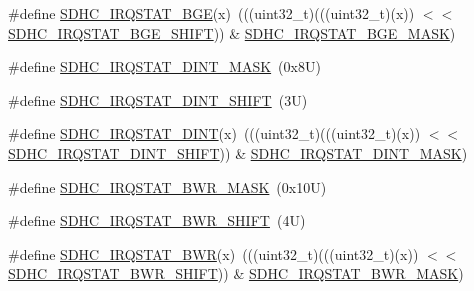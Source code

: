\begin{DoxyCompactItemize}
\item 
\#define \mbox{\hyperlink{group___s_d_h_c___register___masks_gaf7f550254ba83d0557f63801bd944d28}{S\+D\+H\+C\+\_\+\+I\+R\+Q\+S\+T\+A\+T\+\_\+\+B\+GE}}(x)~(((uint32\+\_\+t)(((uint32\+\_\+t)(x)) $<$$<$ \mbox{\hyperlink{group___s_d_h_c___register___masks_ga75e2ea9856a63d888c9416ad4c2778dc}{S\+D\+H\+C\+\_\+\+I\+R\+Q\+S\+T\+A\+T\+\_\+\+B\+G\+E\+\_\+\+S\+H\+I\+FT}})) \& \mbox{\hyperlink{group___s_d_h_c___register___masks_gabe62f8072b3ceb7a49288ba5976418d0}{S\+D\+H\+C\+\_\+\+I\+R\+Q\+S\+T\+A\+T\+\_\+\+B\+G\+E\+\_\+\+M\+A\+SK}})
\item 
\#define \mbox{\hyperlink{group___s_d_h_c___register___masks_gabed6097264bafe668b2aa727ed9f10c3}{S\+D\+H\+C\+\_\+\+I\+R\+Q\+S\+T\+A\+T\+\_\+\+D\+I\+N\+T\+\_\+\+M\+A\+SK}}~(0x8\+U)
\item 
\#define \mbox{\hyperlink{group___s_d_h_c___register___masks_ga9760308d931d6e654feeaf46f96572ae}{S\+D\+H\+C\+\_\+\+I\+R\+Q\+S\+T\+A\+T\+\_\+\+D\+I\+N\+T\+\_\+\+S\+H\+I\+FT}}~(3\+U)
\item 
\#define \mbox{\hyperlink{group___s_d_h_c___register___masks_gadf0823aae9132e5c37284167522f32f0}{S\+D\+H\+C\+\_\+\+I\+R\+Q\+S\+T\+A\+T\+\_\+\+D\+I\+NT}}(x)~(((uint32\+\_\+t)(((uint32\+\_\+t)(x)) $<$$<$ \mbox{\hyperlink{group___s_d_h_c___register___masks_ga9760308d931d6e654feeaf46f96572ae}{S\+D\+H\+C\+\_\+\+I\+R\+Q\+S\+T\+A\+T\+\_\+\+D\+I\+N\+T\+\_\+\+S\+H\+I\+FT}})) \& \mbox{\hyperlink{group___s_d_h_c___register___masks_gabed6097264bafe668b2aa727ed9f10c3}{S\+D\+H\+C\+\_\+\+I\+R\+Q\+S\+T\+A\+T\+\_\+\+D\+I\+N\+T\+\_\+\+M\+A\+SK}})
\item 
\#define \mbox{\hyperlink{group___s_d_h_c___register___masks_ga26691d1818925c3763302d3b227e6cd4}{S\+D\+H\+C\+\_\+\+I\+R\+Q\+S\+T\+A\+T\+\_\+\+B\+W\+R\+\_\+\+M\+A\+SK}}~(0x10\+U)
\item 
\#define \mbox{\hyperlink{group___s_d_h_c___register___masks_ga4b8780c2cfdce6ddaa2198a39f7eea44}{S\+D\+H\+C\+\_\+\+I\+R\+Q\+S\+T\+A\+T\+\_\+\+B\+W\+R\+\_\+\+S\+H\+I\+FT}}~(4\+U)
\item 
\#define \mbox{\hyperlink{group___s_d_h_c___register___masks_gaad5e38d93f8df5c3493631cf6c929f2a}{S\+D\+H\+C\+\_\+\+I\+R\+Q\+S\+T\+A\+T\+\_\+\+B\+WR}}(x)~(((uint32\+\_\+t)(((uint32\+\_\+t)(x)) $<$$<$ \mbox{\hyperlink{group___s_d_h_c___register___masks_ga4b8780c2cfdce6ddaa2198a39f7eea44}{S\+D\+H\+C\+\_\+\+I\+R\+Q\+S\+T\+A\+T\+\_\+\+B\+W\+R\+\_\+\+S\+H\+I\+FT}})) \& \mbox{\hyperlink{group___s_d_h_c___register___masks_ga26691d1818925c3763302d3b227e6cd4}{S\+D\+H\+C\+\_\+\+I\+R\+Q\+S\+T\+A\+T\+\_\+\+B\+W\+R\+\_\+\+M\+A\+SK}})
$$
\end{DoxyCompactItemize}
